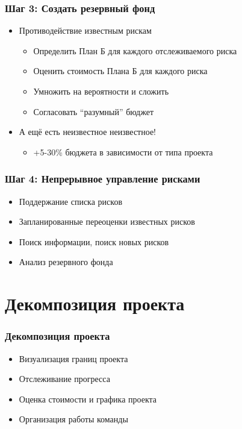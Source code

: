 \documentclass{../../slides-style}
\begin{document}
    \begin{frame}
        \frametitle{Шаг 3: Создать резервный фонд}
        \begin{itemize}
            \item Противодействие известным рискам
            \begin{itemize}
                \item Определить План Б для каждого отслеживаемого риска
                \item Оценить стоимость Плана Б для каждого риска
                \item Умножить на вероятности и сложить
                \item Согласовать ``разумный'' бюджет
            \end{itemize}
            \item А ещё есть неизвестное неизвестное!
            \begin{itemize}
                \item +5-30\% бюджета в зависимости от типа проекта
            \end{itemize}
        \end{itemize}
    \end{frame}

    \begin{frame}
        \frametitle{Шаг 4: Непрерывное управление рисками}
        \begin{itemize}
            \item Поддержание списка рисков
            \item Запланированные переоценки известных рисков
            \item Поиск информации, поиск новых рисков
            \item Анализ резервного фонда
        \end{itemize}
    \end{frame}

    \section{Декомпозиция проекта}

    \begin{frame}
        \frametitle{Декомпозиция проекта}
        \begin{itemize}
            \item Визуализация границ проекта
            \item Отслеживание прогресса
            \item Оценка стоимости и графика проекта
            \item Организация работы команды
        \end{itemize}
    \end{frame}
\end{document}

